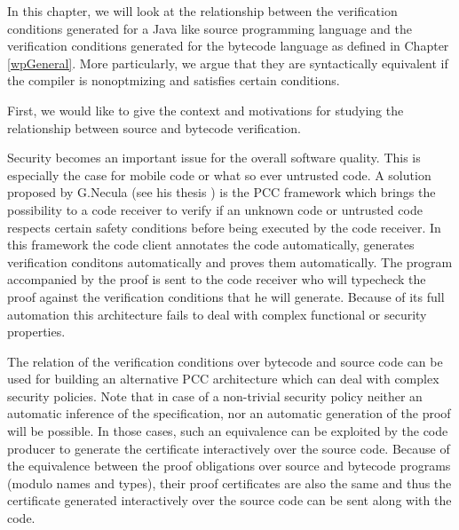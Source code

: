 

In this chapter, we will look at the relationship between
the verification conditions generated for a Java like source programming 
language and the verification conditions generated for the bytecode language 
as defined in Chapter \ref{wpGeneral}. More particularly, we 
argue that they are syntactically equivalent if the compiler is nonoptmizing and satisfies certain 
conditions.
  

First, we would like to give the 
context and motivations for studying the relationship 
between source and bytecode verification.


 Security becomes an important issue for the overall software quality.
This is especially the case for mobile code or what so ever untrusted code. 
A solution  proposed by G.Necula (see his thesis \cite{ComNec}) 
is the PCC framework which brings the possibility to a  code receiver to 
verify if an unknown code  or untrusted code respects certain safety conditions before being executed by the code receiver.
In this framework the code client annotates the code automatically, generates verification conditons automatically
 and proves them automatically.
The  program accompanied by the proof  is sent to the code receiver  who will typecheck the proof against 
the verification conditions that he will generate.
Because of its full automation this architecture fails to deal with complex functional or security properties.


The relation of the verification conditions over bytecode and source code can be used for building an
 alternative PCC architecture which can deal with complex security policies. Note that in case of a non-trivial 
security policy neither an automatic inference of the specification, nor an automatic generation 
of the proof will be possible.
In those cases, such an equivalence can be exploited by the code producer to generate
 the certificate interactively over the source code. Because of the
equivalence between the proof obligations over source and bytecode programs (modulo names and types), 
their  proof certificates are also the same and thus the certificate generated interactively over the
 source code can be sent along with the code.   




